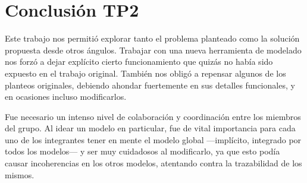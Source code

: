 \section{Conclusión TP2}

Este trabajo nos permitió explorar tanto el problema planteado como la solución
propuesta desde otros ángulos. Trabajar con una nueva herramienta de modelado
nos forzó a dejar explícito cierto funcionamiento que quizás no había sido
expuesto en el trabajo original. También nos obligó a repensar algunos de los
planteos originales, debiendo ahondar fuertemente en sus detalles funcionales, y
en ocasiones incluso modificarlos.

Fue necesario un intenso nivel de colaboración y coordinación entre los miembros
del grupo. Al idear un modelo en particular, fue de vital importancia para cada
uno de los integrantes tener en mente el modelo global —implícito, integrado por
todos los modelos— y ser muy cuidadosos al modificarlo, ya que esto podía causar
incoherencias en los otros modelos, atentando contra la trazabilidad de los
mismos.

